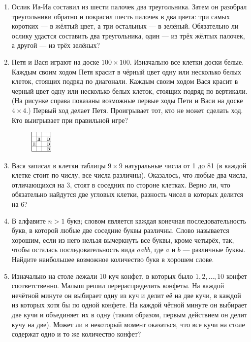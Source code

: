 \documentclass{article}
\begin{document}
\begin{enumerate}[label*=\protect\fbox{\arabic{enumi}}]
\item  Ослик Иа-Иа составил из шести палочек два треугольника. Затем он разобрал треугольники обратно и покрасил шесть палочек в два цвета: три самых коротких — в жёлтый цвет, а три остальных — в зелёный. Обязательно ли ослику удастся составить два треугольника, один — из трёх жёлтых палочек, а другой — из трёх зелёных? 

\item Петя и Вася играют на доске $100 \times 100$. Изначально все клетки доски белые. Каждым своим ходом Петя красит в чёрный цвет одну или несколько белых клеток, стоящих подряд по диагонали. Каждым своим ходом Вася красит в черный цвет одну или несколько белых клеток, стоящих подряд по вертикали. (На рисунке справа показаны возможные первые ходы Пети и Васи на доске $4 \times 4$.) Первый ход делает Петя. Проигрывает тот, кто не может сделать ход. Кто выигрывает при правильной игре?
\begin{figure}[h]
	\centering
	\includegraphics[width=0.1\textwidth]{table.png}
\end{figure}

\item Вася записал в клетки таблицы $9 \times 9$ натуральные числа от 1 до 81 (в каждой клетке стоит по числу, все числа различны). Оказалось, что любые два числа, отличающихся на 3, стоят в соседних по стороне клетках. Верно ли, что обязательно найдутся две угловых клетки, разность чисел в которых делится на 6? 

\item В алфавите $n > 1$ букв; словом является каждая конечная последовательность букв, в которой любые две соседние буквы различны. Слово называется хорошим, если из него нельзя вычеркнуть все буквы, кроме четырёх, так, чтобы осталась последовательность вида $aabb$, где $a$ и $b$ — различные буквы. Найдите наибольшее возможное количество букв в хорошем слове.

\item Изначально на столе лежали 10 куч конфет, в которых было $1, 2, \dotsc, 10$ конфет соответственно. Малыш решил перераспределить конфеты. На каждой нечётной минуте он выбирает одну из куч и делит её на две кучи, в каждой из которых хотя бы по одной конфете. На каждой чётной минуте он выбирает две кучи и объединяет их в одну (таким образом, первым действием он делит кучу на две). Может ли в некоторый момент оказаться, что все кучи на столе содержат одно и то же количество конфет?


\end{enumerate}
\end{document}
